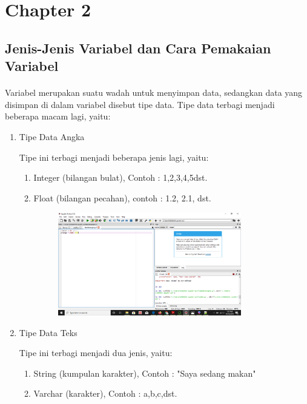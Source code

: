 \section{Chapter 2}
\subsection{Jenis-Jenis Variabel dan Cara Pemakaian Variabel}
\paragraph{}
    Variabel merupakan suatu wadah untuk menyimpan data, sedangkan data yang disimpan di dalam variabel disebut tipe data. Tipe data terbagi menjadi beberapa macam lagi, yaitu:
    \begin{enumerate}
        \item Tipe Data Angka
            \par Tipe ini terbagi menjadi beberapa jenis lagi, yaitu: 
            \par \begin{enumerate}
                \item Integer (bilangan bulat), Contoh : 1,2,3,4,5dst.
                \item Float (bilangan pecahan), contoh : 1.2, 2.1, dst.
                \begin{figure}[h]
                \centerline{\includegraphics[width=8cm]{gambar/tipedataangka.png}}
                \end{figure}
                \end{enumerate}
            
       \newpage
       \item Tipe Data Teks
            \par Tipe ini terbagi menjadi dua jenis, yaitu:
            \par \begin{enumerate}
                \item String (kumpulan karakter), Contoh : "Saya sedang makan"
                \item Varchar (karakter), Contoh : a,b,c,dst.

\end{enumerate}
\end{enumerate}
